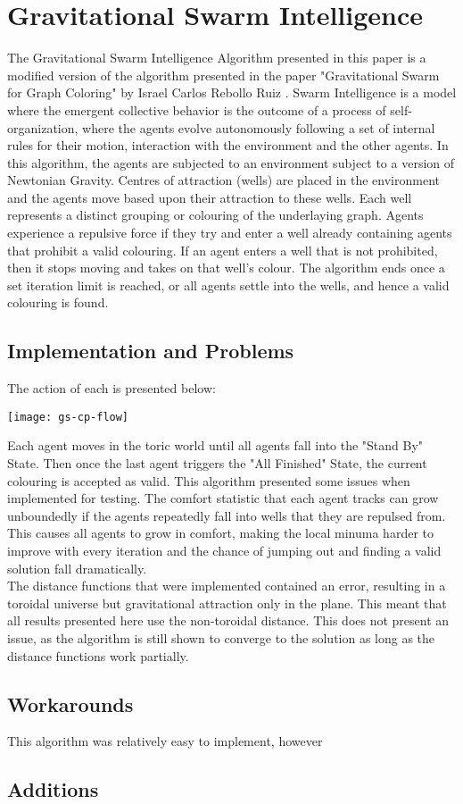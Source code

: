 \section{Gravitational Swarm Intelligence}
The Gravitational Swarm Intelligence Algorithm presented in this paper is a modified version of the algorithm presented in the paper "Gravitational Swarm for Graph Coloring" by Israel Carlos Rebollo Ruiz \cite{bib:GravSwarm}. Swarm Intelligence is a model where the emergent collective behavior is the outcome of a process of self-organization, where the agents evolve autonomously following a set of internal rules for their motion, interaction with the environment and the other agents. In this algorithm, the agents are subjected to an environment subject to a version of Newtonian Gravity. Centres of attraction (wells) are placed in the environment and the agents move based upon their attraction to these wells. Each well represents a distinct grouping or colouring of the underlaying graph. Agents experience a repulsive force if they try and enter a well already containing agents that prohibit a valid colouring. If an agent enters a well that is not prohibited, then it stops moving and takes on that well's colour. The algorithm ends once a set iteration limit is reached, or all agents settle into the wells, and hence a valid colouring is found.

\subsection{Implementation and Problems}
The action of each is presented below:
\begin{center}
\texttt{[image: gs-cp-flow]}
\end{center}
Each agent moves in the toric world until all agents fall into the "Stand By" State. Then once the last agent triggers the "All Finished" State, the current colouring is accepted as valid. This algorithm presented some issues when implemented for testing. The comfort statistic that each agent tracks can grow unboundedly if the agents repeatedly fall into wells that they are repulsed from. This causes all agents to grow in comfort, making the local minuma harder to improve with every iteration and the chance of jumping out and finding a valid solution fall dramatically. 
\\The distance functions that were implemented contained an error, resulting in a toroidal universe but gravitational attraction only in the plane. This meant that all results presented here use the non-toroidal distance. This does not present an issue, as the algorithm is still shown to converge to the solution as long as the distance functions work partially.

\subsection{Workarounds}
This algorithm was relatively easy to implement, however 

\subsection{Additions}